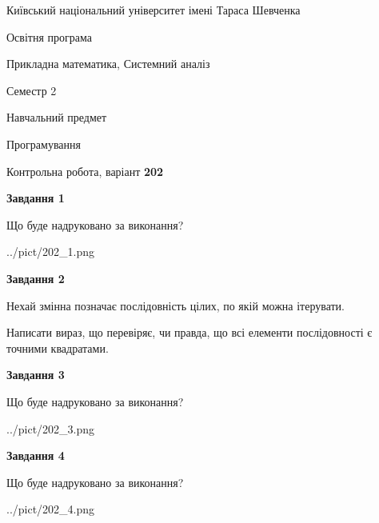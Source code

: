 \documentclass[12pt, ukrainian]{article}
\begin{document}
{{\begin {small}\par
{ \center  Київський національний університет імені Тараса Шевченка \par}
{\parbox {5 cm}{Освітня програма \hfill}{\parbox {8 cm}{Прикладна математика, Системний аналіз \hfill}}\parbox {5 cm}{\hfill Семестр 2}}\par
{\parbox {5 cm} {Навчальний предмет \hfill}\parbox {7 cm}{Програмування \hfill}\parbox {6cm}{\hfill}\par}\vspace{-7pt} \end{small}}{\center Контрольна робота, варіант  \No \textbf
{ 202 }\par}}
{
\begin {large}
{\begin {center}\textbf{Завдання 1}\end {center}}\par
Що буде надруковано за виконання?\par\par
\begin{center}
	{../pict/202_1.png}
\end{center}
\newpage

{\begin {center}\textbf{Завдання 2}\end {center}}\par
Нехай змінна  позначає послідовність цілих, по якій можна ітерувати.

Написати вираз, що перевіряє, чи правда, що всі елементи послідовності є точними квадратами.\par
\newpage

{\begin {center}\textbf{Завдання 3}\end {center}}\par
Що буде надруковано за виконання?\par
\begin{center}
	{../pict/202_3.png}
\end{center}
\newpage

{\begin {center}\textbf{Завдання 4}\end {center}}\par
Що буде надруковано за виконання?\par
\begin{center}
	{../pict/202_4.png}
\end{center}
\newpage


\end{large}}
\end{document}
